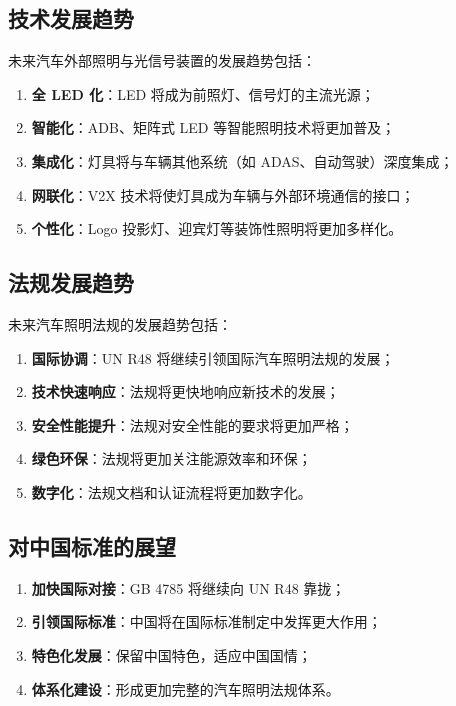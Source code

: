 \subsection{技术发展趋势}

未来汽车外部照明与光信号装置的发展趋势包括：

\begin{enumerate}[leftmargin=2em]
    \item \textbf{全 LED 化}：LED 将成为前照灯、信号灯的主流光源；
    \item \textbf{智能化}：ADB、矩阵式 LED 等智能照明技术将更加普及；
    \item \textbf{集成化}：灯具将与车辆其他系统（如 ADAS、自动驾驶）深度集成；
    \item \textbf{网联化}：V2X 技术将使灯具成为车辆与外部环境通信的接口；
    \item \textbf{个性化}：Logo 投影灯、迎宾灯等装饰性照明将更加多样化。
\end{enumerate}

\subsection{法规发展趋势}

未来汽车照明法规的发展趋势包括：

\begin{enumerate}[leftmargin=2em]
    \item \textbf{国际协调}：UN R48 将继续引领国际汽车照明法规的发展；
    \item \textbf{技术快速响应}：法规将更快地响应新技术的发展；
    \item \textbf{安全性能提升}：法规对安全性能的要求将更加严格；
    \item \textbf{绿色环保}：法规将更加关注能源效率和环保；
    \item \textbf{数字化}：法规文档和认证流程将更加数字化。
\end{enumerate}

\subsection{对中国标准的展望}

\begin{enumerate}[leftmargin=2em]
    \item \textbf{加快国际对接}：GB 4785 将继续向 UN R48 靠拢；
    \item \textbf{引领国际标准}：中国将在国际标准制定中发挥更大作用；
    \item \textbf{特色化发展}：保留中国特色，适应中国国情；
    \item \textbf{体系化建设}：形成更加完整的汽车照明法规体系。
\end{enumerate}

